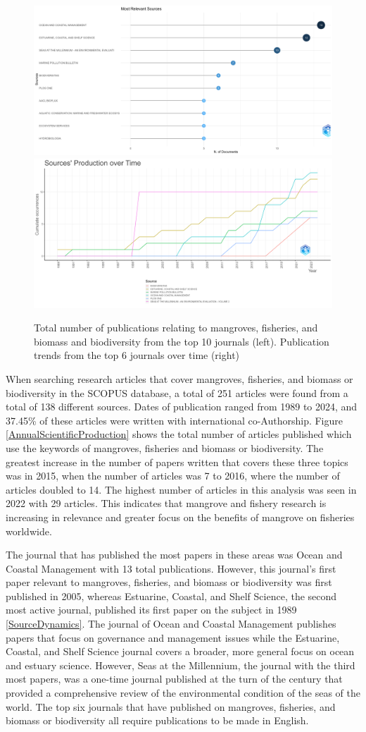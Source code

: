 \documentclass[
  12pt,
]{article}
\begin{document}
\begin{figure}
\includegraphics[width=0.5\linewidth]{MostRelevantSources} \includegraphics[width=0.5\linewidth]{SourceDynamics} \caption{Total number of publications relating to mangroves, fisheries, and biomass and biodiversity from the top 10 journals (left). Publication trends from the top 6 journals over time (right) \label{SourceDynamics}}\label{fig:SourceDynamics}
\end{figure}



When searching research articles that cover mangroves, fisheries, and biomass or biodiversity in the SCOPUS database, a total of 251 articles were found from a total of 138 different sources. Dates of publication ranged from 1989 to 2024, and 37.45\% of these articles were written with international co-Authorship. Figure \ref{AnnualScientificProduction} shows the total number of articles published which use the keywords of mangroves, fisheries and biomass or biodiversity. The greatest increase in the number of papers written that covers these three topics was in 2015, when the number of articles was 7 to 2016, where the number of articles doubled to 14. The highest number of articles in this analysis was seen in 2022 with 29 articles. This indicates that mangrove and fishery research is increasing in relevance and greater focus on the benefits of mangrove on fisheries worldwide.

The journal that has published the most papers in these areas was Ocean and Coastal Management with 13 total publications. However, this journal's first paper relevant to mangroves, fisheries, and biomass or biodiversity was first published in 2005, whereas Estuarine, Coastal, and Shelf Science, the second most active journal, published its first paper on the subject in 1989 \ref{SourceDynamics}. The journal of Ocean and Coastal Management publishes papers that focus on governance and management issues while the Estuarine, Coastal, and Shelf Science journal covers a broader, more general focus on ocean and estuary science. However, Seas at the Millennium, the journal with the third most papers, was a one-time journal published at the turn of the century that provided a comprehensive review of the environmental condition of the seas of the world. The top six journals that have published on mangroves, fisheries, and biomass or biodiversity all require publications to be made in English.
\end{document}
